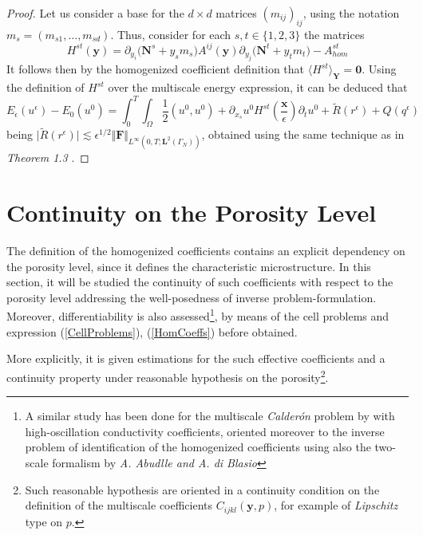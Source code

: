 \begin{proof}
Let us consider a base for the $d\times d$ matrices $(m_{ij})_{ij}$, using the notation $m_s = (m_{s1}, \dots, m_{sd})$. Thus, consider for each $s, t \in \{1,2,3\}$ the matrices 
\begin{equation*}
    H^{st}(\mathbf{y}) = \partial_{y_i}\big(\mathbf{N}^s + y_s m_s\big) A^{ij}(\mathbf{y}) \partial_{y_j} \big(\mathbf{N}^t +  y_t m_t\big) - A^{st}_{hom}
\end{equation*}
It follows then by the homogenized coefficient definition that $\langle H^{st} \rangle_{\mathbf{Y}} = \mathbf{0}$.
Using the definition of $H^{st}$ over the multiscale energy expression, it can be deduced that
\begin{equation*}
    E_{\epsilon}(u^{\epsilon}) - E_{0}(u^{0}) = \int_0^T \int_{\Omega} \frac{1}{2}(u^0, u^0) + \partial_{x_s}u^0 H^{st}(\frac{\mathbf{x}}{\epsilon}) \partial_{t}u^0  + \tilde{R}(r^{\epsilon}) + Q(q^{\epsilon})
\end{equation*}
being $\vert \tilde{R}(r^{\epsilon})\vert \lesssim \epsilon^{1/2}\Vert \mathbf{F} \Vert_{L^{\infty}(0,T;\mathbf{L}^2(\Gamma_N))}$, obtained using the same technique as in \textit{Theorem 1.3} \cite{oleinik1992mathematical}.
\end{proof}

\section{Continuity on the Porosity Level}
The definition of the homogenized coefficients contains an explicit dependency on the porosity level, since it defines the characteristic microstructure. In this section, it will be studied the continuity of such coefficients with respect to the porosity level addressing the well-posedness of inverse problem-formulation. Moreover, differentiability is also assessed\footnote{A similar study has been done for the multiscale \textit{Calderón} problem by with high-oscillation conductivity coefficients, oriented moreover to the inverse problem of identification of the homogenized coefficients using also the two-scale formalism by \textit{A. Abudlle and A. di Blasio}}, by means of the cell problems and expression (\ref{CellProblems}), (\ref{HomCoeffs}) before obtained.

More explicitly, it is given estimations for the such effective coefficients and a continuity property under reasonable hypothesis on the porosity\footnote{Such reasonable hypothesis are oriented in a continuity condition on the definition of the multiscale coefficients $C_{ijkl}(\mathbf{y},p)$, for example of \textit{Lipschitz} type on $p$.}.

